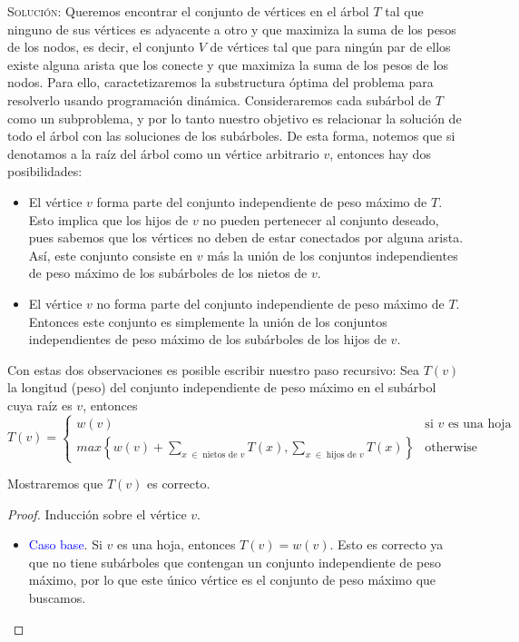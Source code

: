 \documentclass[letterpaper,11pt]{article}
\begin{document}
\begin{enumerate}
    \textsc{Solución:} Queremos encontrar el conjunto de vértices en el árbol 
    $T$ tal que ninguno de sus vértices es adyacente a otro y que maximiza la 
    suma de los pesos de los nodos, es decir, el conjunto $V$ de vértices tal 
    que para ningún par de ellos existe alguna arista que los conecte y que 
    maximiza la suma de los pesos de los nodos. Para ello, caractetizaremos la 
    substructura óptima del problema para resolverlo usando programación 
    dinámica. Consideraremos cada subárbol de $T$ como un subproblema, y por 
    lo tanto nuestro objetivo es relacionar la solución de todo el árbol con 
    las soluciones de los subárboles. De esta forma, notemos que si denotamos 
    a la raíz del árbol como un vértice arbitrario $v$, entonces hay dos 
    posibilidades:
    \begin{itemize}
        \item El vértice $v$ forma parte del conjunto independiente de peso 
        máximo de $T$. Esto implica que los hijos de $v$ no pueden pertenecer 
        al conjunto deseado, pues sabemos que los vértices no deben de estar 
        conectados por alguna arista. Así, este conjunto consiste en $v$ más 
        la unión de los conjuntos independientes de peso máximo de los 
        subárboles de los nietos de $v$.

        \item El vértice $v$ no forma parte del conjunto independiente de peso 
        máximo de $T$. Entonces este conjunto es simplemente la unión de los 
        conjuntos independientes de peso máximo de los subárboles de los hijos 
        de $v$. 
    \end{itemize} 

    Con estas dos observaciones es posible escribir nuestro paso recursivo: Sea 
    $T(v)$ la longitud (peso) del conjunto independiente de peso máximo en el 
    subárbol cuya raíz es $v$, entonces 
    \begin{equation}
        T(v) = 
        \begin{cases}
            w(v) & \text{si $v$ es una hoja} \\
            max \left\{w(v) + \sum_{x \; \in \; \text{nietos de $v$}} 
            T(x), \sum_{x \; \in \; \text{hijos de $v$}} T(x) \right\} 
            & \text{otherwise}
        \end{cases}
        \label{eq:tree}
    \end{equation}

    Mostraremos que $T(v)$ es correcto.
    \begin{proof}
        Inducción sobre el vértice $v$. 
        \begin{itemize}
            \item \textcolor{blue}{Caso base}. Si $v$ es una hoja, entonces 
            $T(v) = w(v)$. Esto es correcto ya que no tiene subárboles que 
            contengan un conjunto independiente de peso máximo, por lo que 
            este único vértice es el conjunto de peso máximo que buscamos. 


\end{itemize}
\end{proof}
\end{enumerate}
\end{document}
